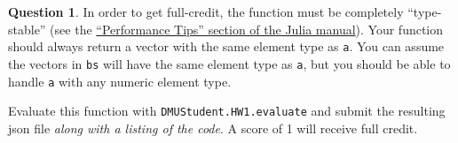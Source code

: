 \documentclass{article}
\theoremstyle{definition}
\newtheorem{question}[thm]{Question}
\begin{document}
\begin{question}
    In order to get full-credit, the function must be completely ``type-stable'' (see the \href{https://docs.julialang.org/en/v1/manual/performance-tips/#Write-%22type-stable%22-functions}{``Performance Tips'' section of the Julia manual}). Your function should always return a vector with the same element type as \texttt{a}. You can assume the vectors in \texttt{bs} will have the same element type as \texttt{a}, but you should be able to handle \texttt{a} with any numeric element type.

    Evaluate this function with \texttt{DMUStudent.HW1.evaluate} and submit the resulting json file \textit{along with a listing of the code}. A score of 1 will receive full credit.
\end{question}
\end{document}
